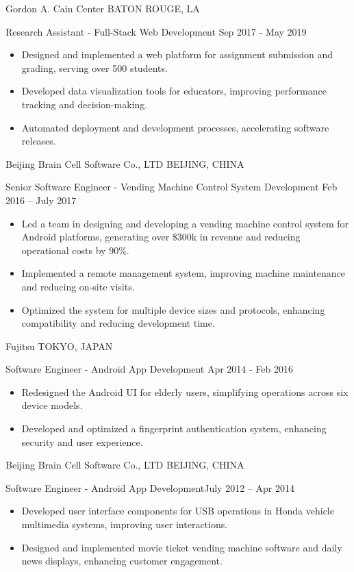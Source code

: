 \documentclass[10pt,a4paper]{article}
\begin{document}
  \headedsection
{Gordon A. Cain Center}
{\textsc{BATON ROUGE, LA}}
{
  \headedsubsection
  {Research Assistant - Full-Stack Web Development}
  {Sep 2017 - May 2019}
  {
    \begin{itemize}
      \item Designed and implemented a web platform for assignment submission and grading, serving over 500 students.
      \item Developed data visualization tools for educators, improving performance tracking and decision-making.
      \item Automated deployment and development processes, accelerating software releases.
    \end{itemize}
  }
}

\headedsection
{Beijing Brain Cell Software Co., LTD}
{\textsc{BEIJING, CHINA}}
  {
    \headedsubsection
    {Senior Software Engineer - Vending Machine Control System Development}
    {Feb 2016 -- July 2017}
    {\vspace{0.1em}
      \begin{itemize}
        \setlength{\itemsep}{0.3em}
        \item Led a team in designing and developing a vending machine control system for Android platforms, generating over \$300k in revenue and reducing operational costs by 90\%.
        \item Implemented a remote management system, improving machine maintenance and reducing on-site visits.
        \item Optimized the system for multiple device sizes and protocols, enhancing compatibility and reducing development time.
      \end{itemize}
    }
  }

\headedsection
{Fujitsu}
{\textsc{TOKYO, JAPAN}}
{
  \headedsubsection
  {Software Engineer - Android App Development}
  {Apr 2014 - Feb 2016}
  {
    \begin{itemize}
      \item Redesigned the Android UI for elderly users, simplifying operations across six device models.
      \item Developed and optimized a fingerprint authentication system, enhancing security and user experience.
    \end{itemize}
  }
}


\vspace{0.2em}
  \headedsection
  {Beijing Brain Cell Software Co., LTD}
  {\textsc{BEIJING, CHINA}}
  {
    \headedsubsection
    {Software Engineer - Android App Development}{July 2012 -- Apr 2014}
    {\vspace{0.1em}
      \begin{itemize}
        \setlength{\itemsep}{0.3em}
        \item Developed user interface components for USB operations in Honda vehicle multimedia systems, improving user interactions.
        \item Designed and implemented movie ticket vending machine software and daily news displays, enhancing customer engagement.
      \end{itemize}
    }
  }
\end{document}
